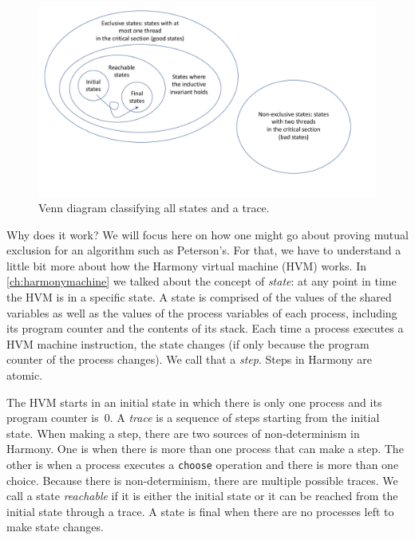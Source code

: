 \documentclass{report}
\begin{document}
\begin{figure}
\begin{center}
\includegraphics[width=6in]{figures/states-crop.pdf}
\end{center}
\caption{Venn diagram classifying all states and a trace.}
\label{fig:states}
\end{figure}

%
%

Why does it work?  We will focus here on how one might go about proving
mutual exclusion for an algorithm such as Peterson's.
For that, we have to understand a little bit more about how the Harmony
virtual machine (HVM) works.
In \autoref{ch:harmonymachine} we talked about the concept of \emph{state}:
%
at any point in time the HVM is in a specific state.
A state is comprised of the values of the shared variables as well as
the values of the process variables
%
of each process, including its
program counter and the contents of its stack.
Each time a process executes a HVM machine instruction, the
state changes (if only because the program counter of the process
changes).  We call that a \emph{step}.
%
Steps in Harmony are atomic.

%
%

The HVM starts in an initial state in which there is only
one process and its program counter is~0.  A \emph{trace}
%
is a sequence of steps starting from the initial state.
When making a step, there are two sources of non-determinism
%
in Harmony.
One is when
there is more than one process that can make a step.  The other is
when a process executes a \texttt{choose} operation and there is
more than one choice.
Because there is non-determinism, there are multiple possible traces.
We call a state \emph{reachable}
%
if it is either the initial state
or it can be reached from the initial state through a trace.
A state is final
when there are no processes left to make state changes.
\end{document}
